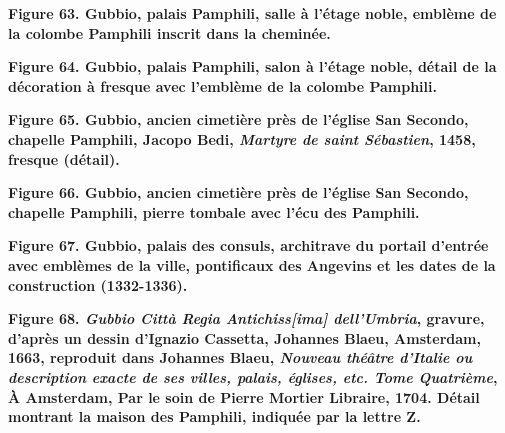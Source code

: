 \documentclass[12pt,twoside,openany]{book}
\begin{document}
\begin{center}
\par\small \textbf{Figure 63. Gubbio, palais Pamphili, salle à l’étage noble, emblème de la colombe Pamphili inscrit dans la cheminée.}
\end{center}

\begin{center}
\par\small \textbf{Figure 64. Gubbio, palais Pamphili, salon à l’étage noble, détail de la décoration à fresque avec l’emblème de la colombe Pamphili.}
\end{center}

\begin{center}
\par\small \textbf{Figure 65. Gubbio, ancien cimetière près de l’église San Secondo, chapelle Pamphili, Jacopo Bedi, \textit{Martyre de saint Sébastien}, 1458, fresque (détail).}
\end{center}

\begin{center}
\par\small \textbf{Figure 66. Gubbio, ancien cimetière près de l’église San Secondo, chapelle Pamphili, pierre tombale avec l’écu des Pamphili.}
\end{center}

\begin{center}
\par\small \textbf{Figure 67. Gubbio, palais des consuls, architrave du portail d’entrée avec emblèmes de la ville, pontificaux des Angevins et les dates de la construction (1332-1336).}
\end{center}

\begin{center}
\par\small \textbf{Figure 68.\textit{ Gubbio Città Regia Antichiss[ima] dell'Umbria}, gravure, d’après un dessin d’Ignazio Cassetta, Johannes Blaeu, Amsterdam, 1663, reproduit dans Johannes Blaeu, \textit{Nouveau théâtre d’Italie ou description exacte de ses villes, palais, églises, etc. Tome Quatrième}, À Amsterdam, Par le soin de Pierre Mortier Libraire, 1704. Détail montrant la maison des Pamphili, indiquée par la lettre Z.}
\end{center}
\end{document}
